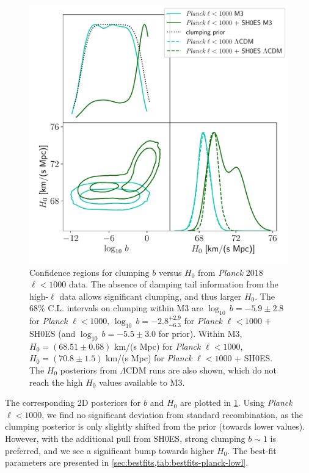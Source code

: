 \begin{figure}[ht!]
\includegraphics[width=\columnwidth]{img/planck-lowl-M3-LCDM-b-H0.pdf}
\caption[Confidence regions for clumping versus $H_0$ from {\it Planck} 2018 $\ell<1000$ data]{Confidence regions for clumping $b$ versus $H_0$ from {\it Planck} 2018 $\ell<1000$ data.
The absence of damping tail information from the high-$\ell$ data allows significant clumping, and thus larger $H_0$.
The 68\% C.L. intervals on clumping within M3 are $\log_{10}\,b = -5.9\pm 2.8$ for {\it Planck} $\ell<1000$, $\log_{10}\,b = -2.8^{+2.9}_{-6.3}$ for {\it Planck} $\ell<1000$ + SH0ES (and $\log_{10}\,b = -5.5\pm 3.0$ for prior).
Within M3, $H_0 = (68.51\pm 0.68)$ km/(s Mpc) for {\it Planck} $\ell<1000$, $H_0 = (70.8\pm 1.5)$ km/(s Mpc) for {\it Planck} $\ell<1000$ + SH0ES.
The $H_0$ posteriors from $\Lambda$CDM runs are also shown, which do not reach the high $H_0$ values available to M3.}
\label{fig:planck-lowl-b-H0}
\end{figure}

The corresponding 2D posteriors for $b$ and $H_0$ are plotted in \cref{fig:planck-lowl-b-H0}.
Using {\it Planck} $\ell<1000$, we find no significant deviation from standard recombination, as the clumping posterior is only slightly shifted from the prior (towards lower values).
However, with the additional pull from SH0ES, strong clumping $b\sim 1$ is preferred, and we see a significant bump towards higher $H_0$.
The best-fit parameters are presented in \cref{sec:bestfits,tab:bestfits-planck-lowl}.

